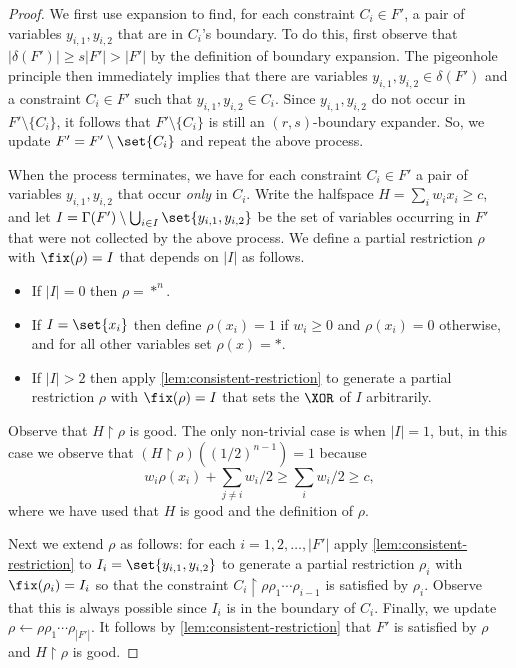 \begin{proof}
	We first use expansion to find, for each constraint $C_i \in F'$, a pair of variables $y_{i,1}, y_{i,2}$ that are in $C_i$'s boundary. To do this, first observe that $|\delta(F')| \geq s |F'| > |F'|$ by the definition of boundary expansion.
	The pigeonhole principle then immediately implies that there are variables $y_{i,1}, y_{i,2} \in \delta(F')$ and a constraint $C_i \in F'$ such that $y_{i,1}, y_{i,2} \in C_i$. 
	Since $y_{i,1},y_{i,2}$ do not occur in $F' \setminus \{C_i\}$, it follows that $F' \setminus \{C_i\}$ is still an $(r, s)$-boundary expander. 
	So, we update $F' = F' \setminus \set{C_i}$ and repeat the above process.

	When the process terminates, we have for each constraint $C_i \in F'$ a pair of variables $y_{i,1}, y_{i,2}$ that occur \emph{only} in $C_i$.
	Write the halfspace $H = \sum_{i} w_i x_i \geq c$, and let $I = \Gamma(F') \setminus \bigcup_{i \in I} \set{y_{i,1}, y_{i,2}}$ be the set of variables occurring in $F'$ that were not collected by the above process.
	We define a partial restriction $\rho$ with $\fix(\rho) = I$ that depends on $|I|$ as follows.	
	\begin{itemize}
		\item If $|I| = 0$ then $\rho = *^n$.
		\item If $I = \set{x_i}$ then define $\rho(x_i) = 1$ if $w_i \geq 0$ and $\rho(x_i) = 0$ otherwise, and for all other variables set $\rho(x) = *$.
		\item If $|I| > 2$ then apply \autoref{lem:consistent-restriction} to generate a partial restriction $\rho$ with $\fix(\rho) = I$ that sets the $\XOR$ of $I$ arbitrarily.
	\end{itemize}
	Observe that $H \restriction \rho$ is good.
	The only non-trivial case is when $|I| = 1$, but, in this case we observe that $(H \restriction \rho)((1/2)^{n-1}) = 1$ because  
	 \[ w_i \rho(x_i) + \sum_{j \neq i} w_i/2 \geq \sum_{i} w_i/2 \geq c,\]
	where we have used that $H$ is good and the definition of $\rho$.

	Next we extend $\rho$ as follows: for each $i = 1, 2, \ldots, |F'|$ apply \autoref{lem:consistent-restriction} to $I_i = \set{y_{i,1}, y_{i,2}}$ to generate a partial restriction $\rho_i$ with $\fix(\rho_i) = I_i$ so that the constraint $C_i \restriction \rho \rho_1 \cdots \rho_{i-1}$ is satisfied by $\rho_i$.
	Observe that this is always possible since $I_i$ is in the boundary of $C_i$.
	Finally, we update $\rho \leftarrow \rho \rho_1 \cdots \rho_{|F'|}$.
	It follows by \autoref{lem:consistent-restriction} that $F'$ is satisfied by $\rho$ and $H \restriction \rho$ is good.
\end{proof}

